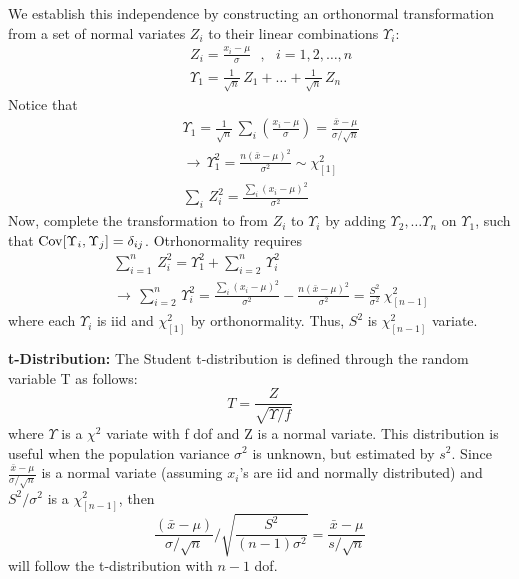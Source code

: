 \documentclass[aps,prl,preprint,superscriptaddress]{revtex4-1}
\begin{document}
We establish this independence by constructing an orthonormal transformation from a set of normal variates
$Z_i$ to their linear combinations $\Upsilon_i$:
%
\begin{eqnarray}
&& Z_i = \frac{x_i - \mu}{\sigma} \,\,\,\, , \,\,\,\, i=1,2, \dots, n \nonumber\\
&& \Upsilon_1 = \frac{1}{\sqrt{n}}\, Z_1 + \dots + \frac{1}{\sqrt{n}}\, Z_n 
\end{eqnarray}
%
Notice that 
%
\begin{eqnarray}
&& \Upsilon_1 = \frac{1}{\sqrt{n}}\, \sum_i \left( \frac{x_i - \mu}{\sigma} \right) = \frac{\bar{x} - \mu}{\sigma/\sqrt{n}}
\nonumber\\
&& \rightarrow \, \Upsilon_1^2 = \frac{n(\bar{x}-\mu)^2}{\sigma^2} \sim \chi^2_{[1]} \nonumber\\
&& \sum_i\, Z_i^2 = \frac{\sum_i ( x_i - \mu)^2}{\sigma^2}
\end{eqnarray}
%
Now, complete the transformation to from $Z_i$ to $\Upsilon_i$ by adding $\Upsilon_2, \dots \Upsilon_n$ on
$\Upsilon_1$, such that ${\rm Cov}[\Upsilon_i, \Upsilon_j] = \delta_{ij}$. Otrhonormality requires
%
\begin{eqnarray}
&& \sum_{i=1}^n\, Z_i^2 = \Upsilon_1^2 + \sum_{i=2}^n\, \Upsilon_i^2 \nonumber\\
&& \rightarrow\, 
\sum_{i=2}^n\, \Upsilon_i^2 = \frac{\sum_i ( x_i - \mu)^2}{\sigma^2} - \frac{n(\bar{x}-\mu)^2}{\sigma^2} 
 = \frac{S^2}{\sigma^2} ~ \chi^2_{[n-1]}
\end{eqnarray}
%
where each $\Upsilon_i$ is iid and $\chi^2_{[1]}$ by orthonormality. Thus, $S^2$ is $\chi^2_{[n-1]}$ variate.

\vspace{0.5cm}

{\bf t-Distribution:} The Student t-distribution is defined through the random variable T as follows:
%
\begin{equation}
T = \frac{Z}{\sqrt{\Upsilon/f}}
\end{equation}
%
where $\Upsilon$ is a $\chi^2$ variate with f dof and Z is a normal variate. This distribution is 
useful when the population variance $\sigma^2$ is unknown, but estimated by $s^2$. 
Since $\frac{\bar{x}-\mu}{\sigma/\sqrt{n}}$ is a normal variate (assuming $x_i$'s are iid and normally
distributed) and $S^2/\sigma^2$ is a $\chi^2_{[n-1]}$, then
%
\begin{equation}
\frac{(\bar{x}-\mu)}{\sigma/\sqrt{n}} \Bigg/ \sqrt{ \frac{S^2}{(n-1) \sigma^2} } = \frac{\bar{x} - \mu}{s/\sqrt{n}}
\end{equation}
%
will follow the t-distribution with $n-1$ dof.
\end{document}
